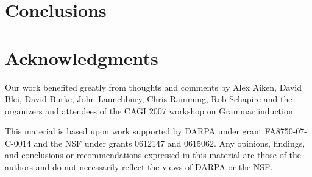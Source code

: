 \documentclass[nocopyrightspace]{sigplanconf}
\begin{document}
\section{Conclusions}
\label{sec:conclusion}


\section*{Acknowledgments}

Our work benefited greatly from thoughts and comments by
Alex Aiken, David Blei, David Burke, John Launchbury, Chris Ramming, 
Rob Schapire
and the organizers and attendees of the CAGI 2007 workshop on Grammar
induction.

This material is based upon work 
supported by DARPA under grant FA8750-07-C-0014
and the NSF
   under grants 0612147 and 0615062.
Any opinions, findings, and conclusions or recommendations
   expressed in this material are those of the authors and do not
   necessarily reflect the views of DARPA or the NSF.




%
\end{document}
